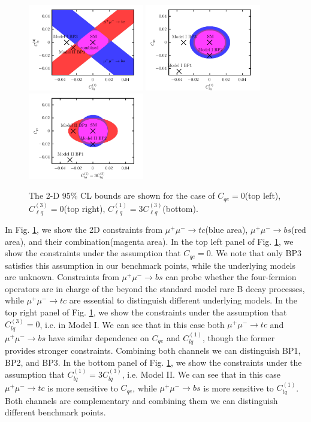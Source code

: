 \documentclass[a4paper,11pt]{article}
\begin{document}
\begin{figure}
    \includegraphics[width=0.45\textwidth]{2dbound-1.pdf}
    \includegraphics[width=0.45\textwidth]{2dbound-2.pdf}
    \includegraphics[width=0.45\textwidth]{2dbound-3.pdf}
\caption{The 2-D 95\% CL bounds are shown for the case of $C_{qe}=0$(top left), $C_{\ell q}^{(3)}=0$(top right), $C_{\ell q}^{(1)}=3C_{\ell q}^{(3)}$(bottom).}\label{fig:cll2d}
\end{figure}

In Fig. \ref{fig:cll2d}, we show the 2D constraints from $\mu^+\mu^-\to tc$(blue area), $\mu^+\mu^-\to bs$(red area), and their combination(magenta area).
In the top left panel of Fig. \ref{fig:cll2d}, we show the constraints under the assumption that $C_{qe}=0$.
We note that only BP3 satisfies this assumption in our benchmark points,
while the underlying models are unknown.
Constraints from $\mu^+\mu^-\to bs$ can probe whether the four-fermion operators are in charge of the beyond the standard model rare B decay processes,
while $\mu^+\mu^-\to tc$ are essential to distinguish different underlying models.
In the top right panel of Fig. \ref{fig:cll2d},
we show the constraints under the assumption that $C_{lq}^{(3)}=0$, i.e. in Model I.
We can see that in this case both $\mu^+\mu^-\to tc$ and $\mu^+\mu^-\to bs$ have similar dependence on $C_{qe}$ and $C_{lq}^{(1)}$, though the former provides stronger constraints.
Combining both channels we can distinguish BP1, BP2, and BP3.
In the bottom panel of Fig. \ref{fig:cll2d},
we show the constraints under the assumption that $C_{lq}^{(1)}=3C_{lq}^{(3)}$, i.e. Model II.
We can see that in this case $\mu^+\mu^-\to tc$ is more sensitive to $C_{qe}$, while $\mu^+\mu^-\to bs$ is more sensitive to $C_{lq}^{(1)}$.
Both channels are complementary and combining them we can distinguish different benchmark points.
\end{document}
